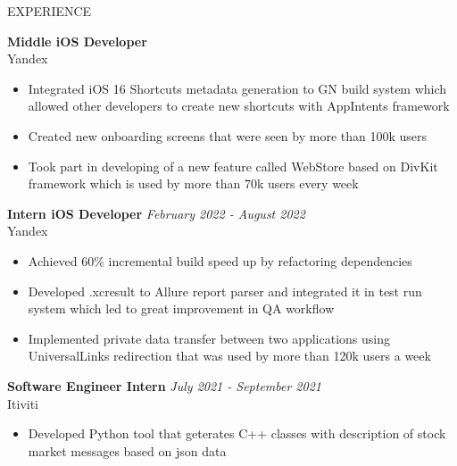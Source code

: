 \documentclass{cv} %
\begin{document}
\begin{rSection}{EXPERIENCE}

\textbf{Middle iOS Developer} \hfill {}\\
 Yandex \hfill \textit{}
 \begin{itemize}
    \itemsep -3pt {} 
     \item Integrated iOS 16 Shortcuts metadata generation to GN build system which allowed other developers to create new shortcuts with AppIntents framework
     \item Created new onboarding screens that were seen by more than 100k users
     \item Took part in developing of a new feature called WebStore based on DivKit framework which is used by more than 70k users every week
 \end{itemize}
 
\textbf{Intern iOS Developer} \hfill \emph{February 2022 - August 2022}\\
 Yandex \hfill \textit{}
 \begin{itemize}
    \itemsep -3pt {} 
     \item Achieved 60\% incremental build speed up by refactoring dependencies
     \item Developed .xcresult to Allure report parser and integrated it in test run system which led to great improvement in QA workflow
     \item Implemented private data transfer between two applications using UniversalLinks redirection that was used by more than 120k users a week
 \end{itemize}
 
 \textbf{Software Engineer Intern} \hfill \emph{July 2021 - September 2021}\\
Itiviti \hfill \textit{}
 \begin{itemize}
    \itemsep -3pt {} 
     \item Developed Python tool that geterates C++ classes with description of stock market messages based on json data
 \end{itemize}

\end{rSection} 

\end{document}
